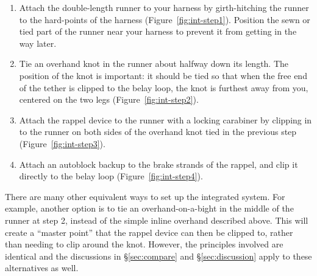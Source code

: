 \documentclass[nonacm,acmtog]{acmart}
\begin{document}
   \begin{enumerate}
      \item Attach the double-length runner to your harness by girth-hitching
      the runner to the hard-points of the harness
      (Figure~\ref{fig:int-step1}).  Position the sewn or tied part of the
      runner near your harness to prevent it from getting in the way later.

      \item Tie an overhand knot in the runner about halfway down its length.
      The position of the knot is important: it should be tied so that when the
      free end of the tether is clipped to the belay loop, the knot is furthest
      away from you, centered on the two legs (Figure~\ref{fig:int-step2}).

      \item Attach the rappel device to the runner with a locking carabiner by
      clipping in to the runner on both sides of the overhand knot tied in the
      previous step (Figure~\ref{fig:int-step3}).

      \item Attach an autoblock backup to the brake strands of the rappel, and
      clip it directly to the belay loop (Figure~\ref{fig:int-step4}).
   \end{enumerate}

   There are many other equivalent ways to set up the integrated system.  For
   example, another option is to tie an overhand-on-a-bight in the middle of
   the runner at step 2, instead of the simple inline overhand described above.
   This will create a ``master point'' that the rappel device can then be
   clipped to, rather than needing to clip around the knot.  However, the
   principles involved are identical and the discussions in \S\ref{sec:compare}
   and \S\ref{sec:discussion} apply to these alternatives as well.
\end{document}

